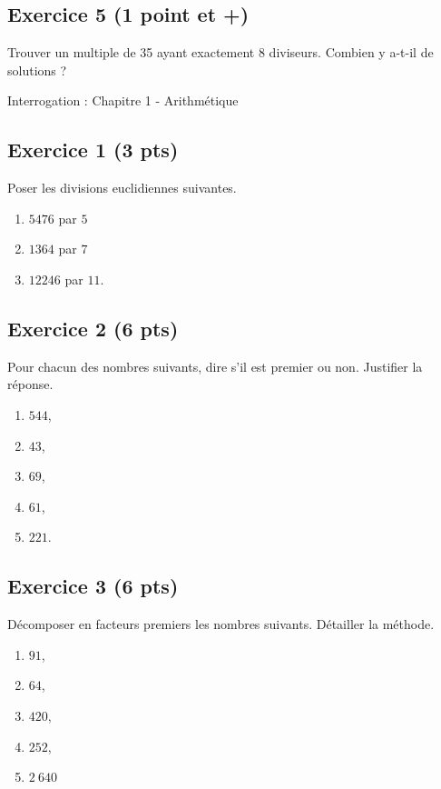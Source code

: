 \documentclass[14 pt]{extarticle}
\theoremstyle{plain}
\begin{document}
\subsection*{Exercice 5 (1 point et +)}

Trouver un multiple de 35 ayant exactement 8 diviseurs. Combien y a-t-il de solutions ?
\newpage\begin{center}{\Large Interrogation : Chapitre 1 - Arithmétique}\\ 
 \end{center}




\subsection*{Exercice 1 (3 pts)}
 Poser les divisions euclidiennes suivantes. 
 
 
 \begin{enumerate}
 \item $5476$ par $5$
 \item $1364$ par $7$ 
 \item $12 246$ par $11$. 
 \end{enumerate}
 \subsection*{Exercice 2 (6 pts)}
 
 Pour chacun des nombres suivants, dire s'il est premier ou non. Justifier la réponse. 
\begin{enumerate}
\item $544$,
\item $43$,
\item $69$,
\item $61$,
\item $221$.
\end{enumerate}

\subsection*{Exercice 3 (6 pts)}
Décomposer en facteurs premiers les nombres suivants. Détailler la méthode. 

\begin{enumerate}
\item $91$,
\item $64$,
\item $420$,
\item $252$,
\item $2~640$
\end{enumerate}
\end{document}
